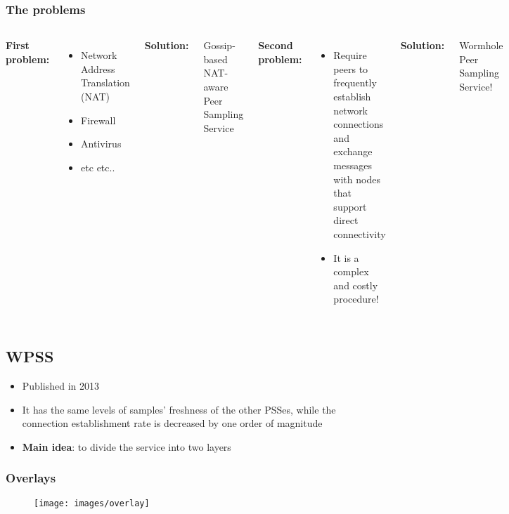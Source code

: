 \documentclass{beamer}
\begin{document}
\begin{frame}
\frametitle{The problems}
\begin{columns}[t] %

\textbf{First problem:}

\begin{itemize}
	\item Network Address Translation (NAT)
	\item Firewall
	\item Antivirus
	\item etc etc..
\end{itemize}

\pause
\textbf{Solution:}

Gossip-based NAT-aware Peer Sampling Service


\textbf{Second problem:}
\begin{itemize}
	\item Require peers to frequently establish network connections and exchange messages with nodes that support direct connectivity
	\item It is a complex and costly procedure!
\end{itemize}
\pause
\textbf{Solution:}

Wormhole Peer Sampling Service!

\end{columns}
\end{frame}

\subsection{WPSS}

\begin{frame}
\begin{itemize}
	\item Published in 2013
	\item It has the same levels of samples' freshness  of the other PSSes, while the connection establishment rate is decreased by one order of magnitude
	\pause
	\item \textbf{Main idea}: to divide the service into two layers
\end{itemize}
\end{frame}

\begin{frame}
\frametitle{Overlays}

\begin{figure}
\texttt{[image: images/overlay]}
\end{figure}

\end{frame}
\end{document}
